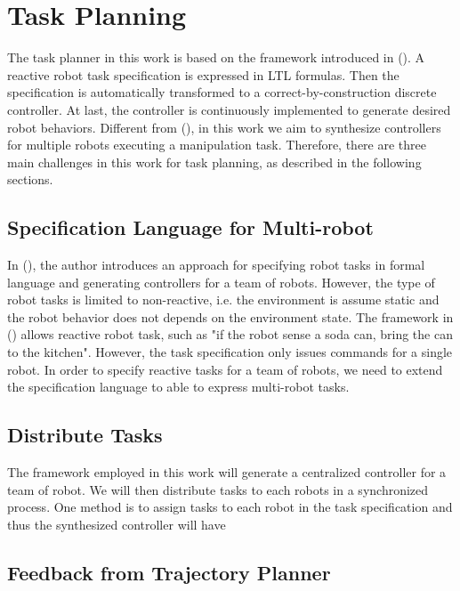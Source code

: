 \section{Task Planning}
The task planner in this work is based on the framework introduced in ().
A reactive robot task specification is expressed in LTL formulas.
Then the specification is automatically transformed to a correct-by-construction discrete controller.
At last, the controller is continuously implemented to generate desired robot behaviors.
Different from (), in this work we aim to synthesize controllers for multiple robots executing a manipulation task.
Therefore, there are three main challenges in this work for task planning, as described in the following sections.

\subsection{Specification Language for Multi-robot}
In (), the author introduces an approach for specifying robot tasks in formal language and generating controllers for a team of robots. 
However, the type of robot tasks is limited to non-reactive, i.e. the environment is assume static and the robot behavior does not depends on the environment state.
The framework in () allows reactive robot task, such as "if the robot sense a soda can, bring the can to the kitchen".
However, the task specification only issues commands for a single robot.
In order to specify reactive tasks for a team of robots, we need to extend the specification language to able to express  multi-robot tasks.

\subsection{Distribute Tasks}
The framework employed in this work will generate a centralized controller for a team of robot.
We will then distribute tasks to each robots in a synchronized process.
One method is to assign tasks to each robot in the task specification and thus the synthesized controller will have
\subsection{Feedback from Trajectory Planner}

